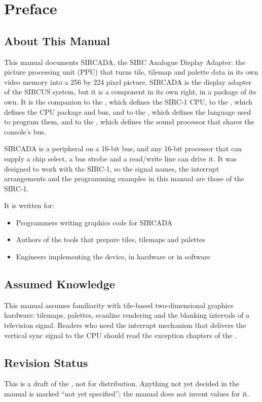 \chapter*{Preface}
\label{ch:preface}

\section*{About This Manual}

This manual documents SIRCADA, the SIRC Analogue Display Adapter: the picture processing unit (PPU) that turns tile,
tilemap and palette data in its own video memory into a 256 by 224 pixel picture. SIRCADA is the display adapter of the
SIRCUS system, but it is a component in its own right, in a package of its own. It is the companion to the
\archmanual{}, which defines the SIRC-1 CPU, to the \hwmanual{}, which defines the CPU package and bus, and to the
\asmmanual{}, which defines the language used to program them, and to the \audiomanual{}, which defines the sound
processor that shares the console's bus.

SIRCADA is a peripheral on a 16-bit bus, and any 16-bit processor that can supply a chip select, a bus strobe and a
read/write line can drive it. It was designed to work with the SIRC-1, so the signal names, the interrupt arrangements
and the programming examples in this manual are those of the SIRC-1.

It is written for:

\begin{itemize}
	\item Programmers writing graphics code for SIRCADA
	\item Authors of the tools that prepare tiles, tilemaps and palettes
	\item Engineers implementing the device, in hardware or in software
\end{itemize}

\section*{Assumed Knowledge}

This manual assumes familiarity with tile-based two-dimensional graphics hardware: tilemaps, palettes, scanline
rendering and the blanking intervals of a television signal. Readers who need the interrupt mechanism that delivers the
vertical sync signal to the CPU should read the exception chapters of the \archmanual{}.

\section*{Revision Status}

This is a draft of the \videomanual{}, not for distribution. Anything not yet decided in the manual is marked ``not yet
specified''; the manual does not invent values for it.

